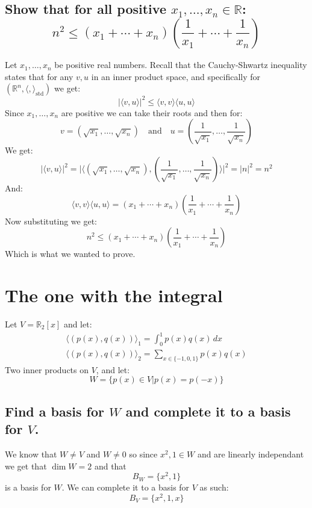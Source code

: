 \documentclass[11pt,a4paper]{article}
\theoremstyle{plain}
\DeclareMathOperator{\std}{std}
\newcommand{\R}{\mathbb{R}}
\begin{document}
	\subsection{Show that for all positive $x_1,\dots,x_n\in\R$:
	\[
	n^2 \le (x_1+\cdots+x_n)\left(\frac{1}{x_1}+\cdots+\frac{1}{x_n}\right)
	\]}
	Let $x_1,\dots,x_n$ be positive real numbers.
	Recall that the Cauchy-Shwartz inequality states that for any $v,u$ in an 
	inner product space, and specifically for $(\R^n,\langle,\rangle_{\std})$
	we get:
	\[
		\vert\langle v,u\rangle\vert^2 \le \langle v,v\rangle\langle u,u\rangle
	\]
	Since $x_1,\dots,x_n$ are positive we can take their roots and then for:
	\[ 
		v=(\sqrt{x_1},\dots,\sqrt{x_n}) \quad\text{and}\quad 
		u=(\frac{1}{\sqrt{x_1}},\dots,\frac{1}{\sqrt{x_n}})
	\]
	We get:
	\[
		\vert\langle v,u\rangle\vert^2 = 
		\vert\langle (\sqrt{x_1},\dots,\sqrt{x_n}),
		(\frac{1}{\sqrt{x_1}},\dots,\frac{1}{\sqrt{x_n}})\rangle\vert^2 =
		\vert n\vert^2 = n^2
	\]
	And:
	\[
		\langle v,v\rangle\langle u,u\rangle = 
		(x_1+\cdots+x_n)(\frac{1}{x_1}+\cdots+\frac{1}{x_n})
	\]
	Now substituting we get:
	\[
		n^2 \le (x_1+\cdots+x_n)\left(\frac{1}{x_1}+\cdots+\frac{1}{x_n}\right)
	\]
	Which is what we wanted to prove.

	\newpage

	\section{The one with the integral}
	Let $V=\R_2[x]$ and let:
	\begin{align*}
		\langle(p(x),q(x))\rangle_1 = 
		\int_{0}^{1}{p(x)q(x)\,dx} \\
		\langle(p(x),q(x))\rangle_2 = 
		\sum_{x\in\{-1,0,1\}}{p(x)q(x)}
	\end{align*}
	Two inner products on $V$, and let:
	\[
		W = \{p(x)\in V \vert p(x) = p(-x)\}
	\]
	
	\subsection{Find a basis for $W$ and complete it to a basis for $V$.}
	We know that $W\neq V$ and $W\neq 0$ so since $x^2,1\in W$ and are linearly
	independant we get that $\dim W=2$ and that
	\[
		B_W = \{x^2, 1\}
	\]
	is a basis for $W$. We can complete it to a basis for $V$ as such:
	\[
		B_V = \{x^2, 1, x\}
	\]
	
	\newpage
\end{document}
